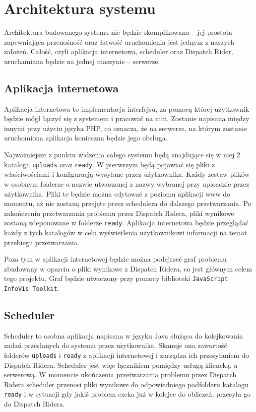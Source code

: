 \chapter{Architektura systemu}
Architektura budowanego systemu nie będzie skomplikowana -- jej prostota zapewniająca przenośność oraz łatwość uruchomienia jest jednym z naszych założeń. Całość, czyli aplikacja internetowa, scheduler oraz Dispatch Rider, uruchamiana
będzie na jednej maszynie -- serwerze.
\section{Aplikacja internetowa}
Aplikacja internetowa to implementacja interfejsu, za pomocą której użytkownik będzie mógł łączyć się z systemem i pracować na nim.
Zostanie napisana między innymi przy użyciu języka PHP, co oznacza, że na serwerze,
na którym zostanie uruchomiona aplikacja konieczna będzie jego obsługa.

Najważniejsze z punktu widzenia całego systemu będą znajdujące się w niej 2 katalogi: \texttt{uploads}
oraz \texttt{ready}. W pierwszym będą pojawiać się pliki z właściwościami i konfiguracją wysyłane przez 
użytkownika. Każdy zestaw plików w osobnym folderze o nazwie utworzonej z nazwy wybranej przy uploadzie
przez użytkownika. Pliki te będzie można edytować z poziomu aplikacji www do momentu, aż nie zostaną
przejęte przez schedulera do dalszego przetwarzania. Po zakończeniu przetwarzania problemu przez Dispatch
Ridera, pliki wynikowe zostaną zdeponowane w folderze \texttt{ready}. Aplikacja internetowa będzie przeglądać
każdy z tych katalogów w celu wyświetlenia użytkownikowi informacji na temat przebiegu przetwarzania.

Poza tym w aplikacji internetowej będzie można podejrzeć graf problemu zbudowany w oparciu o pliki
wynikowe z Dispatch Ridera, co jest głównym celem tego projektu. Graf będzie utworzony przy pomocy
biblioteki \texttt{JavaScript InfoVis Toolkit}.

\section{Scheduler}
Scheduler to osobna aplikacja napisana w języku Java służąca do kolejkowania zadań przesłanych do systemu
przez użytkownika. Skanuje ona zawartość folderów \texttt{uploads} i \texttt{ready} z aplikacji internetowej
i zarządza ich przesyłaniem do Dispatch Ridera. Scheduler jest więc łącznikiem pomiędzy usługą kliencką,
a serwerową. W momencie ukończenia przetwarzania problemu przez Dispatch Ridera scheduler przenosi pliki
wynikowe do odpowiedniego podfolderu katalogu \texttt{ready} i w sytuacji gdy jakiś problem czeka już w kolejce
do obliczeń, przesyła go do Dispatch Ridera.

